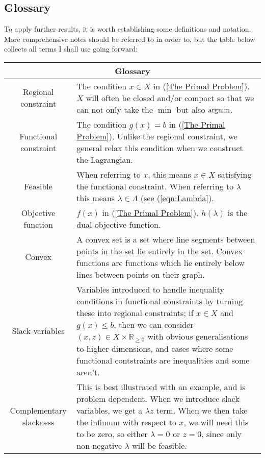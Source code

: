 \documentclass[11pt]{scrartcl}
\begin{document}
\subsection{Glossary}

To apply further results, it is worth establishing some definitions and notation. More comprehensive notes should be referred to in order to, but the table below collects all terms I shall use going forward:

\begin{table}[ht]
    \begin{center}
        \begin{tabular}{|c|p{10cm}|}
            \hline
                \multicolumn{2}{|c|}{\textbf{Glossary}}\\ 
            \hline
                Regional constraint & The condition $x \in X$ in (\ref{The Primal Problem}). $X$ will often be closed and/or compact so that we can not only take the $\min$ but also $\operatorname*{arg min}$. \\ 
            \hline
                Functional constraint & The condition $g(x)=b$ in (\ref{The Primal Problem}). Unlike the regional constraint, we general relax this condition when we construct the Lagrangian. \\
            \hline
                Feasible & When referring to $x$, this means $x \in X$ satisfying the functional constraint. When referring to $\lambda$ this means $\lambda \in \Lambda$ (see (\ref{eqn:Lambda}). \\
            \hline
                Objective function & $f(x)$ in (\ref{The Primal Problem}). $h(\lambda)$ is the dual objective function. \\
            \hline
                Convex & A convex set is a set where line segments between points in the set lie entirely in the set. Convex functions are functions which lie entirely below lines between points on their graph. \\
            \hline
                Slack variables & Variables introduced to handle inequality conditions in functional constraints by turning these into regional constraints; if $x \in X$ and $g(x) \le b$, then we can consider $(x, z) \in X \times \mathbb{R}_{\ge 0}$ with obvious generalisations to higher dimensions, and cases where some functional contstraints are inequalities and some aren't. \\
            \hline
                Complementary slackness & This is best illustrated with an example, and is problem dependent. When we introduce slack variables, we get a $\lambda z$ term. When we then take the infimum with respect to $x$, we will need this to be zero, so either $\lambda=0$ or $z=0$, since only non-negative $\lambda$ will be feasible.\\
            \hline
        \end{tabular}
    \end{center}
\label{tab:Glossary}
\end{table}
\end{document}
